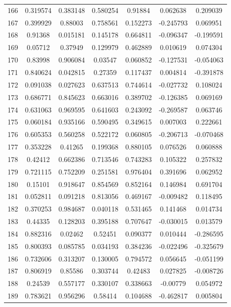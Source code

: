 \begin{table}
\begin{tabular}{c|c|c|c|c|c|c}
166 & 0.319574 & 0.383148 & 0.580254 & 0.91884 & 0.062638 & 0.209039\\
167 & 0.399929 & 0.88003 & 0.758561 & 0.152273 & -0.245793 & 0.069951\\
168 & 0.91368 & 0.015181 & 0.145178 & 0.664811 & -0.096347 & -0.199591\\
169 & 0.05712 & 0.37949 & 0.129979 & 0.462889 & 0.010619 & 0.074304\\
170 & 0.83998 & 0.906084 & 0.03547 & 0.060852 & -0.127531 & -0.054063\\
171 & 0.840624 & 0.042815 & 0.27359 & 0.117437 & 0.004814 & -0.391878\\
172 & 0.091038 & 0.027623 & 0.637513 & 0.744614 & -0.027732 & 0.108024\\
173 & 0.686771 & 0.845623 & 0.663016 & 0.389702 & -0.126385 & 0.069169\\
174 & 0.631063 & 0.969595 & 0.641603 & 0.243092 & -0.269587 & 0.063746\\
175 & 0.060184 & 0.935166 & 0.590495 & 0.349615 & 0.007003 & 0.222661\\
176 & 0.605353 & 0.560258 & 0.522172 & 0.060805 & -0.206713 & -0.070468\\
177 & 0.353228 & 0.41265 & 0.199368 & 0.880105 & 0.076526 & 0.060888\\
178 & 0.42412 & 0.662386 & 0.713546 & 0.743283 & 0.105322 & 0.257832\\
179 & 0.721115 & 0.752209 & 0.251581 & 0.976404 & 0.391696 & 0.062952\\
180 & 0.15101 & 0.918647 & 0.854569 & 0.852164 & 0.146984 & 0.691704\\
181 & 0.052811 & 0.091218 & 0.813056 & 0.469167 & -0.009482 & 0.118495\\
182 & 0.370253 & 0.984687 & 0.040118 & 0.531465 & 0.141468 & 0.014734\\
183 & 0.44335 & 0.128203 & 0.395188 & 0.707647 & -0.030015 & 0.013579\\
184 & 0.882316 & 0.02462 & 0.52451 & 0.090377 & 0.010444 & -0.286595\\
185 & 0.800393 & 0.085785 & 0.034193 & 0.384236 & -0.022496 & -0.325679\\
186 & 0.732606 & 0.313207 & 0.130005 & 0.794572 & 0.056645 & -0.051199\\
187 & 0.806919 & 0.85586 & 0.303744 & 0.42483 & 0.027825 & -0.008726\\
188 & 0.24539 & 0.557177 & 0.330107 & 0.338663 & -0.00779 & 0.054972\\
189 & 0.783621 & 0.956296 & 0.58414 & 0.104688 & -0.462817 & 0.005804\\

\end{tabular}
\end{table}
